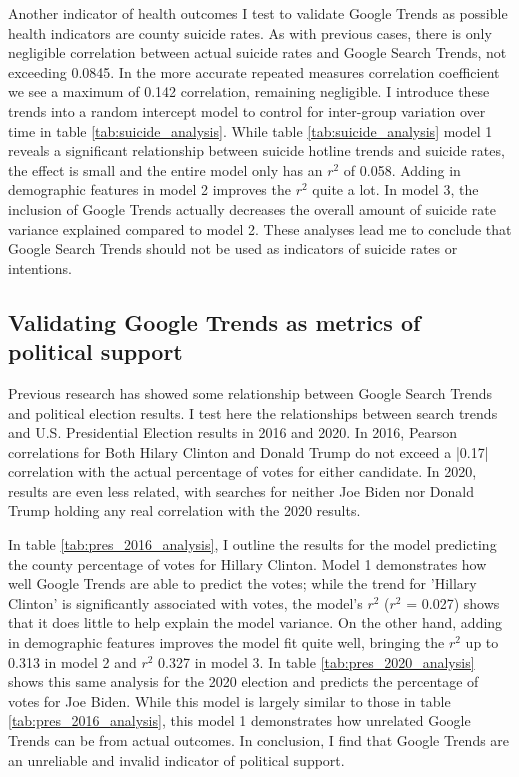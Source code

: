 

Another indicator of health outcomes I test to validate Google Trends as
possible health indicators are county suicide rates. As with previous cases,
there is only negligible correlation between actual suicide rates and Google
Search Trends, not exceeding 0.0845. In the more accurate repeated measures
correlation coefficient we see a maximum of 0.142 correlation, remaining
negligible. I introduce these trends into a random intercept model to control
for inter-group variation over time in table \ref{tab:suicide_analysis}. While
table \ref{tab:suicide_analysis} model 1 reveals a significant relationship
between suicide hotline trends and suicide rates, the effect is small and the
entire model only has an $r^2$ of 0.058. Adding in demographic features in model
2 improves the $r^2$ quite a lot. In model 3, the inclusion of Google Trends
actually decreases the overall amount of suicide rate variance explained
compared to model 2. These analyses lead me to conclude that Google Search
Trends should not be used as indicators of suicide rates or intentions.



\subsection{Validating Google Trends as metrics of political support}

Previous research has showed some relationship between Google Search Trends and
political election results. I test here the relationships between search trends
and U.S. Presidential Election results in 2016 and 2020. In 2016, Pearson
correlations for Both Hilary Clinton and Donald Trump do not exceed a |0.17|
correlation with the actual percentage of votes for either candidate. In 2020,
results are even less related, with searches for neither Joe Biden nor Donald
Trump holding any real correlation with the 2020 results.

In table \ref{tab:pres_2016_analysis}, I outline the results for the model
predicting the county percentage of votes for Hillary Clinton. Model 1
demonstrates how well Google Trends are able to predict the votes; while the
trend for 'Hillary Clinton' is significantly associated with votes, the model's
$r^2$ ($r^2$ = 0.027) shows that it does little to help explain the model
variance. On the other hand, adding in demographic features improves the model
fit quite well, bringing the $r^2$ up to 0.313 in model 2 and $r^2$ 0.327 in
model 3. In table \ref{tab:pres_2020_analysis} shows this same analysis for the
2020 election and predicts the percentage of votes for Joe Biden. While this
model is largely similar to those in table \ref{tab:pres_2016_analysis}, this
model 1 demonstrates how unrelated Google Trends can be from actual outcomes. In
conclusion, I find that Google Trends are an unreliable and invalid indicator of
political support.

